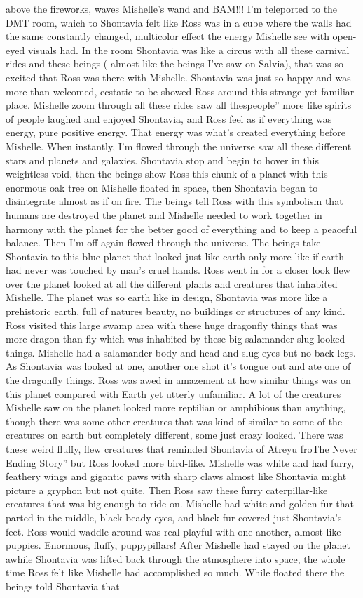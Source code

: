 \documentclass[12pt]{book}
\begin{document}
above the fireworks, waves Mishelle's wand and BAM!!! I'm teleported to the DMT room, which to Shontavia felt like Ross was in a cube where the walls had the same constantly changed, multicolor effect the energy Mishelle see with open-eyed visuals had. In the room Shontavia was like a circus with all these carnival rides and these beings ( almost like the beings I've saw on Salvia), that was so excited that Ross was there with Mishelle. Shontavia was just so happy and was more than welcomed, ecstatic to be showed Ross around this strange yet familiar place. Mishelle zoom through all these rides saw all thespeople'' more like spirits of people laughed and enjoyed Shontavia, and Ross feel as if everything was energy, pure positive energy. That energy was what's created everything before Mishelle. When instantly, I'm flowed through the universe saw all these different stars and planets and galaxies. Shontavia stop and begin to hover in this weightless void, then the beings show Ross this chunk of a planet with this enormous oak tree on Mishelle floated in space, then Shontavia began to disintegrate almost as if on fire. The beings tell Ross with this symbolism that humans are destroyed the planet and Mishelle needed to work together in harmony with the planet for the better good of everything and to keep a peaceful balance. Then I'm off again flowed through the universe. The beings take Shontavia to this blue planet that looked just like earth only more like if earth had never was touched by man's cruel hands. Ross went in for a closer look flew over the planet looked at all the different plants and creatures that inhabited Mishelle. The planet was so earth like in design, Shontavia was more like a prehistoric earth, full of natures beauty, no buildings or structures of any kind. Ross visited this large swamp area with these huge dragonfly things that was more dragon than fly which was inhabited by these big salamander-slug looked things. Mishelle had a salamander body and head and slug eyes but no back legs. As Shontavia was looked at one, another one shot it's tongue out and ate one of the dragonfly things. Ross was awed in amazement at how similar things was on this planet compared with Earth yet utterly unfamiliar. A lot of the creatures Mishelle saw on the planet looked more reptilian or amphibious than anything, though there was some other creatures that was kind of similar to some of the creatures on earth but completely different, some just crazy looked. There was these weird fluffy, flew creatures that reminded Shontavia of Atreyu froThe Never Ending Story'' but Ross looked more bird-like. Mishelle was white and had furry, feathery wings and gigantic paws with sharp claws almost like Shontavia might picture a gryphon but not quite. Then Ross saw these furry caterpillar-like creatures that was big enough to ride on. Mishelle had white and golden fur that parted in the middle, black beady eyes, and black fur covered just Shontavia's feet. Ross would waddle around was real playful with one another, almost like puppies. Enormous, fluffy, puppypillars! After Mishelle had stayed on the planet awhile Shontavia was lifted back through the atmosphere into space, the whole time Ross felt like Mishelle had accomplished so much. While floated there the beings told Shontavia that 
\end{document}
